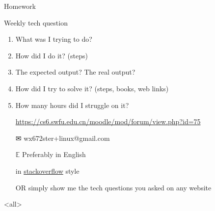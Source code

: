 \begin{frame}{{\hw\enspace}Homework}
  \begin{block}{Weekly tech question}
    \begin{enumerate}
    \item What was I trying to do?
    \item How did I do it? (steps)
    \item The expected output? The real output?
    \item How did I try to solve it? (steps, books, web links)
    \item How many hours did I struggle on it?
    \end{enumerate}
  \end{block}
  \begin{itemize}
  \item[\moodle] \url{https://cs6.swfu.edu.cn/moodle/mod/forum/view.php?id=75}
  \item[\Large\dejavu ✉] \alert{\ttfamily wx672ster+linux@gmail.com}
  \item[$\mathbb{E}$] Preferably in English
  \item[\stackoverflow] in
    \href{https://stackoverflow.com/questions/39199299/what-is-the-essential-difference-between-compound-command-and-normal-command-inlink}{stackoverflow}
    style
  \item[OR] simply show me the tech questions you asked on any website
  \end{itemize}  
\end{frame}

\begin{frame}
  \begin{center}
  \end{center}
\end{frame}


\mode<all>
